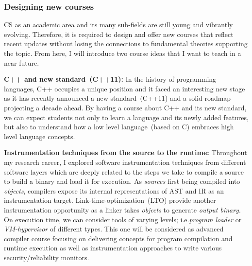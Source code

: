 \documentclass[letterpaper, 10pt]{article}
\def\ie{i.e.\xspace}
\begin{document}
\begin{small}
\subsubsection*{Designing new courses} 

CS as an academic area and its many sub-fields are still young and vibrantly
evolving. Therefore, it is required to design and offer new courses that
reflect recent updates without losing the connections to fundamental theories
supporting the topic. From here, I will introduce two course ideas that I want
to teach in a near future. 

{\bf C++ and new standard~(C++11):} In the history of programming languages,
C++ occupies a unique position and it faced an interesting new stage as it
has recently announced a new standard~(C++11) and a solid roadmap projecting a
decade ahead.
%
%
By having a course about C++ and its new standard, we can expect students not
only to learn a language and its newly added features, but also to understand
how a low level language~(based on C) embraces high level language concepts. 

{\bf Instrumentation techniques from the source to the runtime:} 
Throughout my research career, I explored software instrumentation techniques
from different software layers which are deeply related to the steps we take to
compile a source to build a binary and load it for execution. 
%
As {\it sources} first being compiled into {\it objects}, compilers expose its
internal representations of AST and IR as an instrumentation target.
%
Link-time-optimization~(LTO) provide another instrumentation opportunity as a
linker takes {\it objects} to generate {\it output binary}. 
%
On execution time, we can consider tools of varying levels; \ie {\it program
loader} or {\it VM-hypervisor} of different types.
%
This one will be considered as  advanced compiler course focusing on delivering
concepts for program compilation and runtime execution as well as
instrumentation approaches to write various security/reliability monitors.


\end{small}
\end{document}
